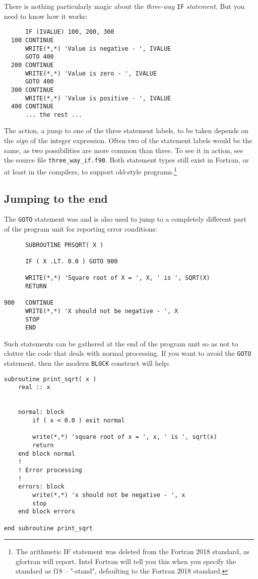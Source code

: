 There is nothing particularly magic about the \emph{three-way} \verb+IF+ \emph{statement}.
But you need to know how it works:
%
\begin{verbatim}
      IF (IVALUE) 100, 200, 300
  100 CONTINUE
      WRITE(*,*) 'Value is negative - ', IVALUE
      GOTO 400
  200 CONTINUE
      WRITE(*,*) 'Value is zero - ', IVALUE
      GOTO 400
  300 CONTINUE
      WRITE(*,*) 'Value is positive - ', IVALUE
  400 CONTINUE
      ... the rest ...
\end{verbatim}
%
The action, a jump to one of the three statement labels, to be taken depends on the
\emph{sign} of the integer expression. Often two of the statement labels would be the same,
as two possibilities are more common than three. To see it in action, see the source
file \verb+three_way_if.f90+. Both statement types still exist in Fortran, or at least
in the compilers, to support old-style programs.\footnote{The arithmetic IF statement
was deleted from the Fortran 2018 standard, as gfortran will report. Intel Fortran
will tell you this when you specify the standard as f18 -- "-stand", defaulting to the
Fortran 2018 standard.}


\subsection{Jumping to the end}
\label{jumpingtoend}
The \verb+GOTO+ statement was and is also used to jump to a completely different
part of the program unit for reporting error conditions:
%
\begin{verbatim}
      SUBROUTINE PRSQRT( X )

      IF ( X .LT. 0.0 ) GOTO 900

      WRITE(*,*) 'Square root of X = ', X, ' is ', SQRT(X)
      RETURN

900   CONTINUE
      WRITE(*,*) 'X should not be negative - ', X
      STOP
      END
\end{verbatim}

Such statements can be gathered at the end of the program unit so as not to clotter
the code that deals with normal processing. If you want to avoid the \verb+GOTO+ statement,
then the modern \verb+BLOCK+ construct will help:
%
\begin{verbatim}
subroutine print_sqrt( x )
    real :: x


    normal: block
        if ( x < 0.0 ) exit normal

        write(*,*) 'square root of x = ', x, ' is ', sqrt(x)
        return
    end block normal
    !
    ! Error processing
    !
    errors: block
        write(*,*) 'x should not be negative - ', x
        stop
    end block errors

end subroutine print_sqrt
\end{verbatim}

